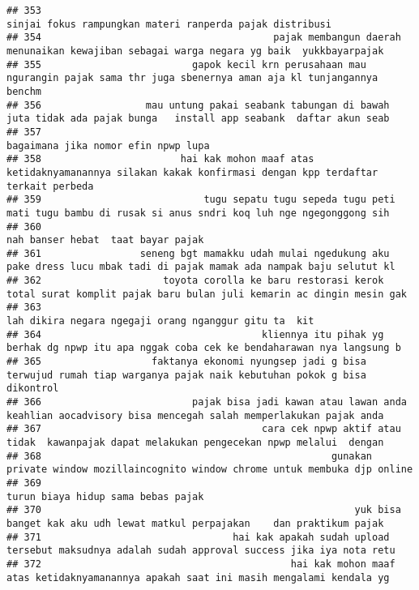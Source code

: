 \documentclass[
]{article}
\begin{document}
\begin{verbatim}
## 353                                                                        sinjai fokus rampungkan materi ranperda pajak distribusi 
## 354                                        pajak membangun daerah menunaikan kewajiban sebagai warga negara yg baik  yukkbayarpajak 
## 355                          gapok kecil krn perusahaan mau ngurangin pajak sama thr juga sbenernya aman aja kl tunjangannya benchm 
## 356                  mau untung pakai seabank tabungan di bawah  juta tidak ada pajak bunga   install app seabank  daftar akun seab 
## 357                                                                                             bagaimana jika nomor efin npwp lupa 
## 358                        hai kak mohon maaf atas ketidaknyamanannya silakan kakak konfirmasi dengan kpp terdaftar terkait perbeda 
## 359                            tugu sepatu tugu sepeda tugu peti mati tugu bambu di rusak si anus sndri koq luh nge ngegonggong sih 
## 360                                                                                              nah banser hebat  taat bayar pajak 
## 361                 seneng bgt mamakku udah mulai ngedukung aku pake dress lucu mbak tadi di pajak mamak ada nampak baju selutut kl 
## 362                     toyota corolla ke baru restorasi kerok total surat komplit pajak baru bulan juli kemarin ac dingin mesin gak
## 363                                                                           lah dikira negara ngegaji orang nganggur gitu ta  kit 
## 364                                      kliennya itu pihak yg berhak dg npwp itu apa nggak coba cek ke bendaharawan nya langsung b 
## 365                   faktanya ekonomi nyungsep jadi g bisa terwujud rumah tiap warganya pajak naik kebutuhan pokok g bisa dikontrol
## 366                          pajak bisa jadi kawan atau lawan anda keahlian aocadvisory bisa mencegah salah memperlakukan pajak anda
## 367                                      cara cek npwp aktif atau tidak  kawanpajak dapat melakukan pengecekan npwp melalui  dengan 
## 368                                                  gunakan private window mozillaincognito window chrome untuk membuka djp online 
## 369                                                                                               turun biaya hidup sama bebas pajak
## 370                                                      yuk bisa banget kak aku udh lewat matkul perpajakan    dan praktikum pajak 
## 371                                 hai kak apakah sudah upload tersebut maksudnya adalah sudah approval success jika iya nota retu 
## 372                                           hai kak mohon maaf atas ketidaknyamanannya apakah saat ini masih mengalami kendala yg 

\end{verbatim}
\end{document}
